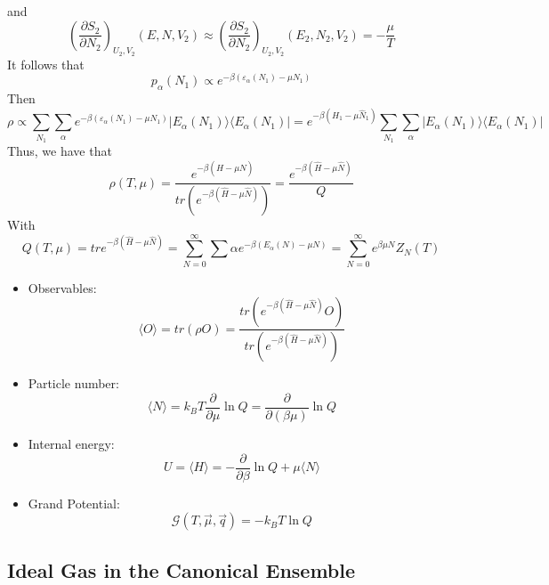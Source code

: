 \documentclass[12pt, a4paper, oneside, openright, titlepage]{book}
\begin{document}
and 
\begin{equation*}
    \left(\frac{\partial S_2}{\partial N_2}\right)_{U_2,V_2}(E,N,V_2) \approx \left(\frac{\partial S_2}{\partial N_2}\right)_{U_2,V_2}(E_2,N_2,V_2) = -\frac{\mu}{T}
\end{equation*}
It follows that \begin{equation*}
    p_{\alpha}(N_1) \propto e^{-\beta(\varepsilon_{\alpha}(N_1) - \mu N_1)}
\end{equation*}
Then \begin{equation*}
    \rho \propto \sum_{N_1}\sum_{\alpha}e^{-\beta(\varepsilon_{\alpha}(N_1)-\mu N_1)}|E_{\alpha}(N_1)\rangle \langle E_{\alpha}(N_1)| = e^{-\beta(H_1-\mu \hat{N}_1)}\sum_{N_1}\sum_{\alpha}|E_{\alpha}(N_1)\rangle\langle E_{\alpha}(N_1)|
\end{equation*}
Thus, we have that \begin{equation*}
    \boxed{\rho(T,\mu) = \frac{e^{-\beta(\hat{H}-\mu\hat{N})}}{tr(e^{-\beta(\hat{H}-\mu\hat{N})})} = \frac{e^{-\beta(\hat{H}-\mu\hat{N})}}{Q}}
\end{equation*}
With $$Q(T,\mu) = tr e^{-\beta(\hat{H}-\mu\hat{N})} = \sum_{N=0}^{\infty}\sum{\alpha}e^{-\beta(E_{\alpha}(N)-\mu N)}=\sum_{N=0}^{\infty}e^{\beta \mu N}Z_N(T)$$
\begin{itemize}
    \item Observables: $$\langle O\rangle = tr(\rho O) = \frac{tr(e^{-\beta(\hat{H}-\mu\hat{N})}O)}{tr(e^{-\beta(\hat{H}-\mu\hat{N})})}$$
    \item Particle number: $$\langle N\rangle = k_BT\frac{\partial }{\partial \mu}\ln Q = \frac{\partial}{\partial(\beta \mu)}\ln Q$$
    \item Internal energy: $$U = \langle H\rangle = -\frac{\partial }{\partial \beta}\ln Q + \mu \langle N\rangle$$
    \item Grand Potential: $$\mathcal{G}(T,\vec{\mu},\vec{q}) = -k_BT\ln Q$$
\end{itemize}





\subsection{Ideal Gas in the Canonical Ensemble}
\end{document}
